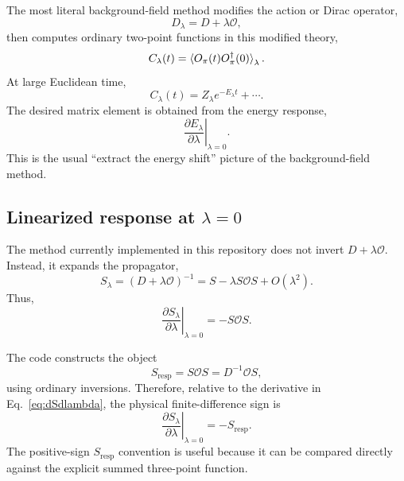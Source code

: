 \documentclass[11pt,a4paper]{article}
\newcommand{\Dslash}{D}
\newcommand{\Slambda}{S_\lambda}
\newcommand{\Szero}{S}
\newcommand{\Sresp}{S_{\mathrm{resp}}}
\newcommand{\Ocur}{\mathcal{O}}
\begin{document}
The most literal background-field method modifies the action or Dirac operator,
\begin{equation}
  \Dslash_\lambda = \Dslash + \lambda \Ocur,
\end{equation}
then computes ordinary two-point functions in this modified theory,
\begin{equation}
  C_\lambda(t)
  =
  \braket{
    O_\pi(t) O_\pi^\dagger(0)
  }_\lambda .
\end{equation}
At large Euclidean time,
\begin{equation}
  C_\lambda(t)
  =
  Z_\lambda e^{-E_\lambda t}
  + \cdots .
\end{equation}
The desired matrix element is obtained from the energy response,
\begin{equation}
  \left.\frac{\partial E_\lambda}{\partial\lambda}\right|_{\lambda=0}.
\end{equation}
This is the usual ``extract the energy shift'' picture of the background-field
method.

\subsection{Linearized response at \(\lambda=0\)}

The method currently implemented in this repository does not invert
\(\Dslash+\lambda\Ocur\).  Instead, it expands the propagator,
\begin{equation}
  \Slambda
  =
  (\Dslash + \lambda \Ocur)^{-1}
  =
  \Szero - \lambda \Szero \Ocur \Szero + O(\lambda^2).
\end{equation}
Thus,
\begin{equation}
  \left.
  \frac{\partial \Slambda}{\partial\lambda}
  \right|_{\lambda=0}
  =
  - \Szero \Ocur \Szero.
\label{eq:dSdlambda}
\end{equation}

The code constructs the object
\begin{equation}
  \Sresp
  =
  \Szero \Ocur \Szero
  =
  \Dslash^{-1} \Ocur \Szero,
\label{eq:Sresponse_code_sign}
\end{equation}
using ordinary inversions.  Therefore, relative to the derivative in
Eq.~\eqref{eq:dSdlambda}, the physical finite-difference sign is
\begin{equation}
  \left.
  \frac{\partial \Slambda}{\partial\lambda}
  \right|_{\lambda=0}
  =
  -\Sresp.
\end{equation}
The positive-sign \(\Sresp\) convention is useful because it can be compared
directly against the explicit summed three-point function.
\end{document}
